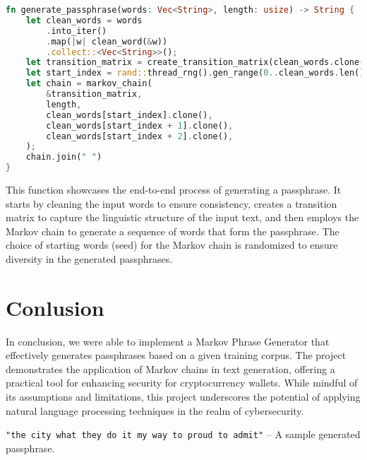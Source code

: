 \documentclass[a4paper,12pt]{article}
\begin{document}
\begin{lstlisting}[language=Rust, caption={Generating the Passphrase}]
fn generate_passphrase(words: Vec<String>, length: usize) -> String {
    let clean_words = words
        .into_iter()
        .map(|w| clean_word(&w))
        .collect::<Vec<String>>();
    let transition_matrix = create_transition_matrix(clean_words.clone());
    let start_index = rand::thread_rng().gen_range(0..clean_words.len() - 3);
    let chain = markov_chain(
        &transition_matrix,
        length,
        clean_words[start_index].clone(),
        clean_words[start_index + 1].clone(),
        clean_words[start_index + 2].clone(),
    );
    chain.join(" ")
}
\end{lstlisting}

This function showcases the end-to-end process of generating a passphrase. It starts by cleaning the input words to ensure consistency, creates a transition matrix to capture the linguistic structure of the input text, and then employs the Markov chain to generate a sequence of words that form the passphrase. The choice of starting words (seed) for the Markov chain is randomized to ensure diversity in the generated passphrases.


\section{Conlusion}

In conclusion, we were able to implement a Markov Phrase Generator that effectively generates passphrases based on a given training corpus. The project demonstrates the application of Markov chains in text generation, offering a practical tool for enhancing security for cryptocurrency wallets. While mindful of its assumptions and limitations, this project underscores the potential of applying natural language processing techniques in the realm of cybersecurity.

\texttt{"the city what they do it my way to proud to admit"} -- A sample generated passphrase.
\end{document}
